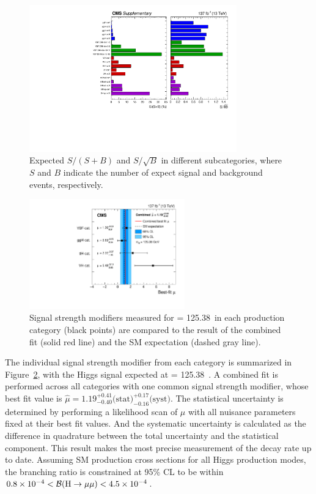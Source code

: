 \begin{figure}[!htb]
    \centering
    \captionsetup{justification=justified}
    \includegraphics[width=0.80\textwidth]{pics/results/purity_signif.pdf}
    \caption{Expected $S/(S+B)$ and $S/\sqrt{B}$ in different subcategories, 
             where $S$ and $B$ indicate the number of expect signal and background events, respectively.}
    \label{fig:sum_cats_SB}
\end{figure}


\begin{figure}[!htb]
    \centering
    \captionsetup{justification=justified}
    \includegraphics[width=0.60\textwidth]{pics/results/sig_strength.pdf}
    \caption{Signal strength modifiers measured for \mh = 125.38~\GeV in each production category (black points) 
             are compared to the result of the combined fit (solid red line) and the SM expectation (dashed gray line).}
    \label{fig:sum_sig_strength}
\end{figure}

The individual signal strength modifier from each category is summarized in Figure~\ref{fig:sum_sig_strength},
with the Higgs signal expected at \mh = 125.38~\GeV.
A combined fit is performed across all categories with one common signal strength modifier, 
whose best fit value is $\hat{\mu} = 1.19^{+0.41}_{-0.40} \text{(stat)}^{+0.17}_{-0.16} \text{(syst)}$.
The statistical uncertainty is determined by performing a likelihood scan of $\mu$ with all nuisance parameters fixed at their best fit values.
And the systematic uncertainty is calculated as the difference in quadrature between the total uncertainty and the statistical component.
This result makes the most precise measurement of the \hmm decay rate up to date.
Assuming SM production cross sections for all Higgs production modes, 
the \hmm branching ratio is constrained at 95\% CL to be within $0.8 \times 10^{-4} < {\mathcal{B}(\mathrm{H} \to \mu\mu)} < 4.5 \times 10^{-4}$.

